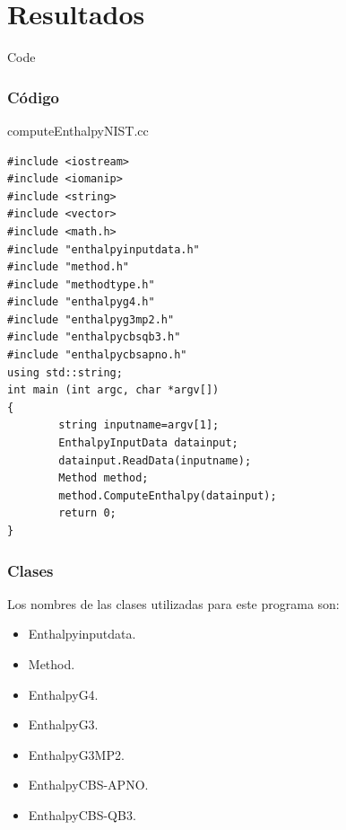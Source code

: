 \documentclass{beamer}
\begin{document}
\section{Resultados}
\begin{frame}[fragile]{Code}
\frametitle{Código}

\begin{block}{computeEnthalpyNIST.cc}
\begin{lstlisting}
#include <iostream>
#include <iomanip>
#include <string>
#include <vector>
#include <math.h>
#include "enthalpyinputdata.h"
#include "method.h"
#include "methodtype.h"
#include "enthalpyg4.h"
#include "enthalpyg3mp2.h"
#include "enthalpycbsqb3.h"
#include "enthalpycbsapno.h"
using std::string;
int main (int argc, char *argv[])
{    
        string inputname=argv[1];
        EnthalpyInputData datainput;
        datainput.ReadData(inputname);    
        Method method;
        method.ComputeEnthalpy(datainput);    
        return 0;
}
\end{lstlisting}
\end{block}
\end{frame}

\begin{frame}
\frametitle{Clases}
Los nombres de las clases utilizadas para este programa son:
\begin{itemize}
	\item Enthalpyinputdata.
	\item Method.
	\item EnthalpyG4.
	\item EnthalpyG3.
	\item EnthalpyG3MP2.
	\item EnthalpyCBS-APNO.
	\item EnthalpyCBS-QB3.
\end{itemize}
\end{frame}
\end{document}
